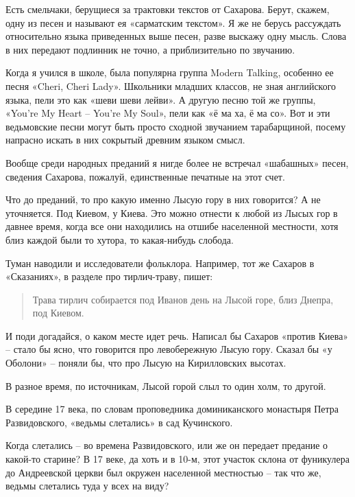 Есть смельчаки, берущиеся за трактовки текстов от Сахарова. Берут, скажем, одну из песен и называют ея «сарматским текстом». Я же не берусь рассуждать относительно языка приведенных выше песен, разве выскажу одну мысль. Слова в них передают подлинник не точно, а приблизительно по звучанию.

Когда я учился в школе, была популярна группа Mod\-ern Talking, особенно ее песня «Cheri, Cheri Lady». Школьники младших классов, не зная английского языка, пели это как «шеви шеви лейви». А другую песню той же группы, «You're My Heart – You're My Soul», пели как «ё ма ха, ё ма со». Вот и эти ведьмовские песни могут быть просто сходной звучанием тарабарщиной, посему напрасно искать в них сокрытый древним языком смысл.
 
Вообще среди народных преданий я нигде более не встречал «шабашных» песен, сведения Сахарова, пожалуй, единственные печатные на этот счет.

Что до преданий, то про какую именно Лысую гору в них говорится? А не уточняется. Под Киевом, у Киева. Это можно отнести к любой из Лысых гор в давнее время, когда все они находились на отшибе населенной местности, хотя близ каждой были то хутора, то какая-нибудь слобода.

Туман наводили и исследователи фольклора. Например, тот же Сахаров в «Сказаниях», в разделе про тирлич-траву, пишет:

\begin{quotation}
Трава тирлич собирается под Иванов день на Лысой горе, близ Днепра, под Киевом.
\end{quotation}

И поди догадайся, о каком месте идет речь. Написал бы Сахаров «против Киева» – стало бы ясно, что говорится про левобережную Лысую гору. Сказал бы «у Оболони» – поняли бы, что про Лысую на Кирилловских высотах.


В разное время, по источникам, Лысой горой слыл то один холм, то другой.

В середине 17 века, по словам проповедника доминиканского монастыря Петра Развидовского, «ведьмы слетались» в сад Кучинского.

Когда слетались – во времена Развидовского, или же он передает предание о какой-то старине? В 17 веке, да хоть и в 10-м, этот участок склона от фуникулера до Андреевской церкви был окружен населенной местностью – так что же, ведьмы слетались туда у всех на виду?

